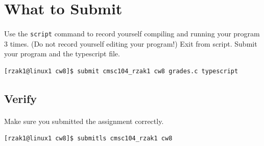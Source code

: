 \documentclass[letter,11pt]{article}
\begin{document}
\section*{What to Submit}
\paragraph{}Use the \texttt{script} command to record yourself compiling and running your program 3 times. (Do not record yourself editing your program!) Exit from script. Submit your program and the typescript file.
\begin{verbatim}
[rzak1@linux1 cw8]$ submit cmsc104_rzak1 cw8 grades.c typescript
\end{verbatim}

\subsection*{Verify}
\paragraph{}Make sure you submitted the assignment correctly.
\begin{verbatim}
[rzak1@linux1 cw8]$ submitls cmsc104_rzak1 cw8
\end{verbatim}
\end{document}
